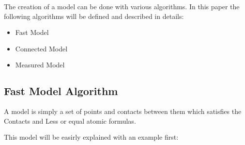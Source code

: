 \documentclass{article}
\begin{document}
		The creation of a model can be done with various algorithms. In this paper the following algorithms will be defined and described in details:
		\begin{itemize} 
			\item Fast Model
			\item Connected Model
			\item Measured Model
		\end{itemize}

	\newpage
		\subsection{Fast Model Algorithm}
			A model is simply a set of points and contacts between them which satisfies the Contacts and Less or equal atomic formulas.

			This model will be easirly explained with an example first:
\end{document}
